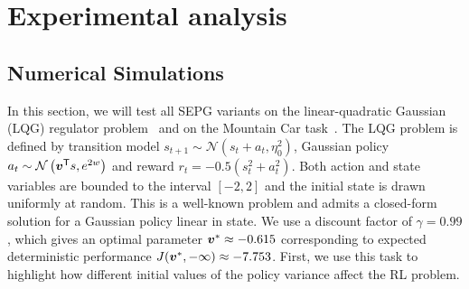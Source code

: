 \chapter{Experimental analysis}
\label{ch:experim}
\thispagestyle{empty}

\fancyhead[LE,RO]{\bfseries\thepage}                               
\fancyhead[RE]{\bfseries\leftmark}    
\fancyhead[LO]{\bfseries\rightmark}  

\section{Numerical Simulations}\label{sec:exp}

\begin{table}
\caption{Upper bound confidence intervals at 95\% of $|\vv - \vv^*|$ after 10,000 iterations.}\label{exp:convergence-speed}

\end{table}
In this section, we will test all SEPG variants on the linear-quadratic Gaussian (LQG) regulator problem~\cite{peters} and on the Mountain Car task~\cite{sutton1998reinforcement}.
The LQG problem is defined by transition model $s_{t+1} \sim \mathcal{N}\left( s_t + a_t, \eta_0^2 \right)$, Gaussian policy $a_t \sim \mathcal{N} \left( {\boldsymbol{v}}^{\mathsf{T}} s, e^{2w} \right)$ and reward $r_t = -0.5\left(s_t^2 + a_t^2\right)$. Both action and state variables are bounded to the interval $[ -2, 2] $ and the initial state is drawn uniformly at random. This is a well-known problem and admits a closed-form solution for a Gaussian policy linear in state. We use a discount factor of $\gamma = 0.99$, which gives an optimal parameter $\boldsymbol{v}^* \approx -0.615$ corresponding to expected deterministic performance $J(\boldsymbol{v}^*,-\infty) \approx -7.753$. First, we use this task to highlight how different initial values of the policy variance affect the RL problem.
